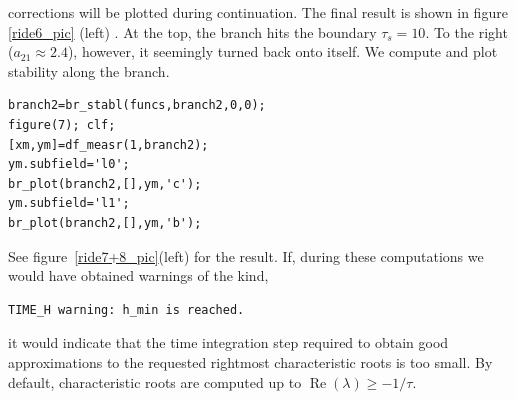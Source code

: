 \documentclass[10pt]{scrartcl}
\renewcommand{\Re}{\operatorname{Re}}
\begin{document}
corrections will be plotted during continuation.  The final result is
shown in figure \ref{ride6_pic} (left) .  At the top, the branch hits the
boundary $\tau_s=10$. To the right ($a_{21}\approx2.4$), however, it
seemingly turned back onto itself.  We compute and plot stability
along the branch.
\begin{lstlisting}
branch2=br_stabl(funcs,branch2,0,0);
figure(7); clf;
[xm,ym]=df_measr(1,branch2);
ym.subfield='l0';
br_plot(branch2,[],ym,'c');
ym.subfield='l1';
br_plot(branch2,[],ym,'b');  
\end{lstlisting}
See figure~\ref{ride7+8_pic}(left) for the result. If, during these
computations we would have obtained warnings of the kind, 
{\small
\begin{verbatim}
TIME_H warning: h_min is reached.
\end{verbatim}}
\noindent it would indicate that the time integration step required to obtain good
approximations to the requested rightmost characteristic roots 
is too small.
By default, characteristic roots are computed 
up to $\Re(\lambda)\geq-1/\tau$.
\end{document}
